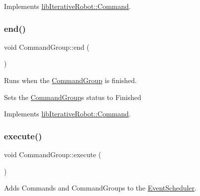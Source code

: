Implements \mbox{\hyperlink{classlib_iterative_robot_1_1_command_aebef0fdf029a15ee48fbb778c4265609}{lib\+Iterative\+Robot\+::\+Command}}.

\mbox{\label{classlib_iterative_robot_1_1_command_group_a28ad3a1c2f6b4f9aea10efa1a824895e}} 
\subsubsection{\texorpdfstring{end()}{end()}}
{\footnotesize\ttfamily void Command\+Group\+::end (\begin{DoxyParamCaption}{ }\end{DoxyParamCaption})\hspace{0.3cm}{\ttfamily [virtual]}}



Runs when the \mbox{\hyperlink{classlib_iterative_robot_1_1_command_group}{Command\+Group}} is finished. 

Sets the \mbox{\hyperlink{classlib_iterative_robot_1_1_command_group}{Command\+Group}}\textquotesingle{}s status to Finished 

Implements \mbox{\hyperlink{classlib_iterative_robot_1_1_command_ab30847f09859387b70bb7846f7ce7ca4}{lib\+Iterative\+Robot\+::\+Command}}.

\mbox{\label{classlib_iterative_robot_1_1_command_group_a5e91d370cafde43548d79945ccb4d8fe}} 
\subsubsection{\texorpdfstring{execute()}{execute()}}
{\footnotesize\ttfamily void Command\+Group\+::execute (\begin{DoxyParamCaption}{ }\end{DoxyParamCaption})\hspace{0.3cm}{\ttfamily [virtual]}}



Adds Commands and Command\+Groups to the \mbox{\hyperlink{classlib_iterative_robot_1_1_event_scheduler}{Event\+Scheduler}}. 


